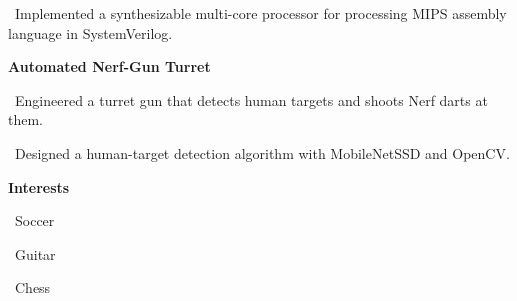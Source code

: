 \documentclass{article}
\begin{document}
\begin{minipage}[t]{3in\linewidth\hspace{0.85in}}
    \vspace{0.3em}
    \small\mdseries
    \hspace{0em}\textasteriskcentered \, \mdseries\textrm{Implemented a synthesizable multi-core processor for processing MIPS assembly language in SystemVerilog.}

    \small\bfseries\textrm{Automated Nerf-Gun Turret}
    
    \vspace{0.3em}
    \small\mdseries
    \hspace{0em}\textasteriskcentered \, \mdseries\textrm{Engineered a turret gun that detects human targets and shoots Nerf darts at them.}

    \vspace{0.5em}
    \hspace{0em}\textasteriskcentered \, \mdseries\textrm{Designed a human-target detection algorithm with MobileNetSSD and OpenCV.}

    \vspace{6.5em}
    \begin{minipage}[t]{3.75in\textwidth\hspace{0in}}
        \large\mdseries\bfseries{Interests}            
        
        \small\mdseries
        \vspace{0.3em}
        \hspace{0.3em}\textasteriskcentered \, \small\mdseries\textrm{Soccer}

        \vspace{0.3em}
        \hspace{0.3em}\textasteriskcentered \, \small\mdseries\textrm{Guitar}        
        
        \vspace{0.3em}
        \hspace{0.3em}\textasteriskcentered \, \small\mdseries\textrm{Chess}

    \end{minipage}

\end{minipage}
\end{document}
